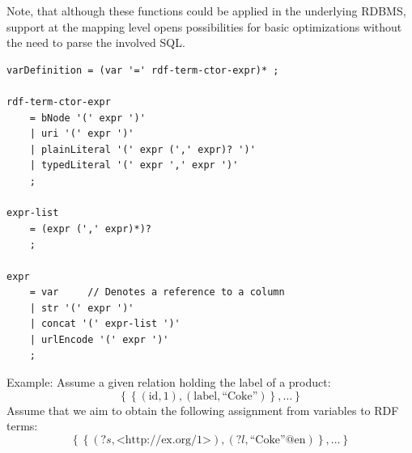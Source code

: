 
Note, that although these functions could
be applied in the underlying RDBMS, support at the mapping level opens
possibilities for basic optimizations without the need to parse the involved
SQL.


%
%
%

\begin{listing}[H]
\caption{EBNF for variable definition expressions}
\label{lst:vardef}
\begin{verbatim}
varDefinition = (var '=' rdf-term-ctor-expr)* ;

rdf-term-ctor-expr
    = bNode '(' expr ')'
    | uri '(' expr ')'
    | plainLiteral '(' expr (',' expr)? ')'
    | typedLiteral '(' expr ',' expr ')'
    ;

expr-list
    = (expr (',' expr)*)?
    ;

expr
    = var     // Denotes a reference to a column
    | str '(' expr ')'
    | concat '(' expr-list ')'
    | urlEncode '(' expr ')'
    ;
\end{verbatim}
\end{listing}

Example:
Assume a given relation holding the label of a product:
\[
\left\{ \left\{ (\text{id}, \text{1}), (\text{label}, \text{``Coke''}) \right\}, \ldots \right\}
\]
Assume that we aim to obtain the following assignment from variables
to RDF terms:
\[
\left\{ \left\{ (?s, \text{<http://ex.org/1>}), (?l, \text{``Coke''@en}) \right\}, \ldots
\right\}
\]

